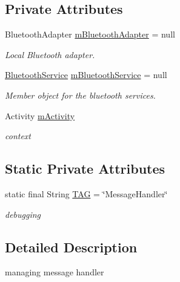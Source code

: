 \subsection*{Private Attributes}
\begin{DoxyCompactItemize}
\item 
Bluetooth\+Adapter \mbox{\hyperlink{classhi_1_1world_1_1hello_1_1myapplication_1_1_message_handler_ae5b9a111ab4b922642e376eaa940dd49}{m\+Bluetooth\+Adapter}} = null
\begin{DoxyCompactList}\small\item\em Local Bluetooth adapter. \end{DoxyCompactList}\item 
\mbox{\hyperlink{classhi_1_1world_1_1hello_1_1myapplication_1_1_bluetooth_service}{Bluetooth\+Service}} \mbox{\hyperlink{classhi_1_1world_1_1hello_1_1myapplication_1_1_message_handler_a6d4cc2b25e157632e8c0b3d69bcb0062}{m\+Bluetooth\+Service}} = null
\begin{DoxyCompactList}\small\item\em Member object for the bluetooth services. \end{DoxyCompactList}\item 
Activity \mbox{\hyperlink{classhi_1_1world_1_1hello_1_1myapplication_1_1_message_handler_aea04de3c9ae7a2a0946c7c039a42d2d5}{m\+Activity}}
\begin{DoxyCompactList}\small\item\em context \end{DoxyCompactList}\end{DoxyCompactItemize}
\subsection*{Static Private Attributes}
\begin{DoxyCompactItemize}
\item 
static final String \mbox{\hyperlink{classhi_1_1world_1_1hello_1_1myapplication_1_1_message_handler_a0ab36705ac35817da5d6d7d21779a318}{T\+AG}} = \char`\"{}Message\+Handler\char`\"{}
\begin{DoxyCompactList}\small\item\em debugging \end{DoxyCompactList}\end{DoxyCompactItemize}


\subsection{Detailed Description}
managing message handler 

